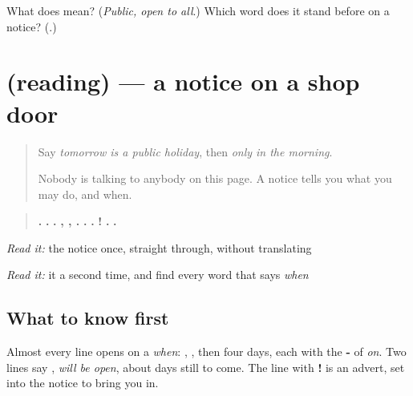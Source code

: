 \begin{tcolorbox}[breakable,colback=teal!4,colframe=teal!35!black,title={Before you move on}]
What does \textbf{} mean? (\emph{Public, open to all}.) Which word does it stand before on a notice? (\textbf{}.)
\end{tcolorbox}
\section[(reading)]{(reading) — a notice on a shop door}

\label{lesson:GU-C151-dukan-notis}



\begin{quote}
Say \emph{tomorrow is a public holiday}, then \emph{only in the morning}.

Nobody is talking to anybody on this page. A notice tells you what you may do, and when.
\end{quote}

\begin{tcolorbox}[breakable,skin=enhanced,colback=orange!6,colframe=orange!45!black,boxrule=0.5pt,arc=1mm,left=6pt,right=6pt,top=4pt,bottom=4pt,fonttitle=\bfseries,title={Read this}]
\begin{quote}
\textbf{}
\end{quote}

\begin{quote}
\textbf{      .} \textbf{   .} \textbf{  .} \textbf{, ,   .} \textbf{     .} \textbf{       .} \textbf{   !} \textbf{     .} \textbf{.}
\end{quote}

\emph{Read it:} the notice once, straight through, without translating

\emph{Read it:} it a second time, and find every word that says \emph{when}
\end{tcolorbox}

\subsection*{What to know first}
Almost every line opens on a \emph{when}: \textbf{}, \textbf{}, then four days, each with the \textbf{-} of \emph{on}. Two lines say \textbf{ }, \emph{will be open}, about days still to come. The line with \textbf{!} is an advert, set into the notice to bring you in.

